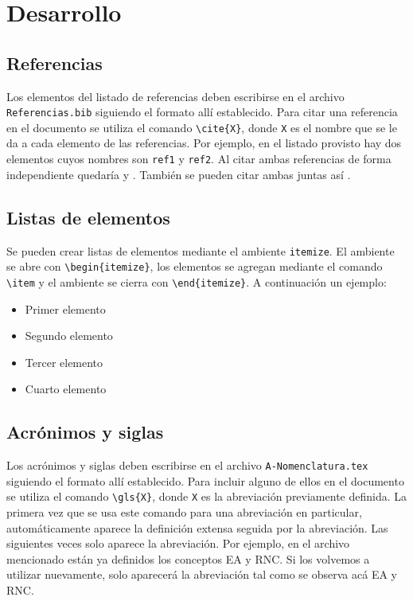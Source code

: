 \section{Desarrollo}

\subsection{Referencias}
Los elementos del listado de referencias deben escribirse en el archivo \verb!Referencias.bib! siguiendo el formato allí establecido. Para citar una referencia en el documento se utiliza el comando \verb!\cite{X}!, donde \verb!X! es el nombre que se le da a cada elemento de las referencias. Por ejemplo, en el listado provisto hay dos elementos cuyos nombres son \verb!ref1! y \verb!ref2!. Al citar ambas referencias de forma independiente quedaría \cite{ref1} y \cite{ref2}. También se pueden citar ambas juntas así \cite{ref1, ref2}.

\subsection{Listas de elementos}
Se pueden crear listas de elementos mediante el ambiente \verb!itemize!. El ambiente se abre con \verb!\begin{itemize}!, los elementos se agregan mediante el comando \verb!\item! y el ambiente se cierra con \verb!\end{itemize}!. A continuación un ejemplo:

\begin{itemize}
    \item Primer elemento
    \item Segundo elemento
    \item Tercer elemento
    \item Cuarto elemento
\end{itemize}

\subsection{Acrónimos y siglas}
Los acrónimos y siglas deben escribirse en el archivo \verb!A-Nomenclatura.tex! siguiendo el formato allí establecido. Para incluir alguno de ellos en el documento se utiliza el comando \verb!\gls{X}!, donde \verb!X! es la abreviación previamente definida. La primera vez que se usa este comando para una abreviación en particular, automáticamente aparece la definición extensa seguida por la abreviación. Las siguientes veces solo aparece la abreviación. Por ejemplo, en el archivo mencionado están ya definidos los conceptos \gls{EA} y \gls{RNC}. Si los volvemos a utilizar nuevamente, solo aparecerá la abreviación tal como se observa acá \gls{EA} y \gls{RNC}.

